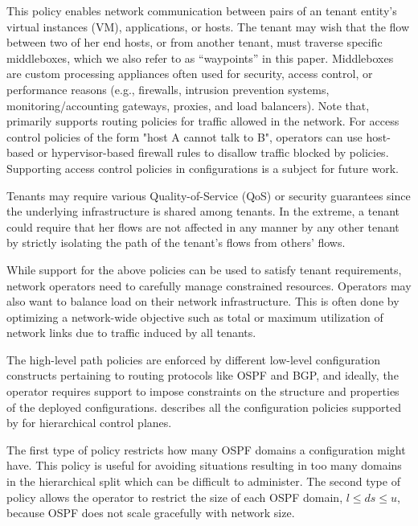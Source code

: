This policy enables network communication
between pairs of an tenant entity's virtual instances (VM), 
applications, or hosts.  
The tenant may wish that the flow
between two of her end hosts, or from another tenant, must traverse
specific middleboxes, which we also refer to as ``waypoints'' in
this paper. Middleboxes are custom processing appliances often used
for security, access control, or performance reasons (e.g.,
firewalls, intrusion prevention systems, monitoring/accounting
gateways, proxies, and load balancers). Note that, \name 
primarily supports routing policies for traffic allowed in the network.
For access control policies of the form "host A cannot talk to B", operators
can use host-based or hypervisor-based firewall rules  
to disallow traffic blocked by policies. Supporting access control policies 
in configurations is a subject for future work.    

 Tenants may require various
Quality-of-Service (QoS) or security guarantees since the 
underlying infrastructure is shared among tenants. In the extreme, a
tenant could require that her flows are not affected in any manner
by any other tenant by strictly isolating the path of the tenant's
flows from others' flows. 

While support for the above policies can be used to satisfy tenant 
requirements, network operators need to 
carefully manage constrained resources. Operators may also want
to balance load on their network infrastructure. This is often done
by optimizing a network-wide objective such as total or maximum
utilization of network links due to traffic induced by all tenants. 

The high-level path policies are enforced by different low-level 
configuration constructs pertaining to routing protocols like OSPF and BGP, 
and ideally, the operator requires support to impose constraints on the structure 
and properties of the deployed configurations. 
describes all the configuration policies supported by \name for hierarchical 
control planes. 


The first type of policy restricts how many OSPF domains 
a configuration might have. This policy is useful for 
avoiding situations resulting in too
many domains in the hierarchical split which can be difficult to
administer. The second type of policy allows the operator to restrict
the size of each OSPF domain, $l\leq ds\leq u$, because OSPF does
not scale gracefully with network size.  

